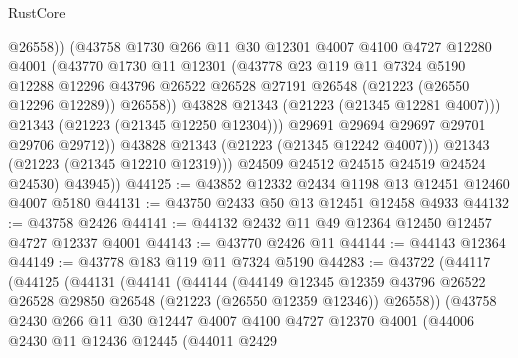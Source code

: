 \begin{lexlean}{RustCore}
\begin{coremodule}
                        @26558))
                    (@43758
                      @1730
                      @266
                      @11
                      @30
                      @12301
                      @4007
                      @4100
                      @4727
                      @12280
                      @4001
                      (@43770
                        @1730
                        @11
                        @12301
                        (@43778
                          @23
                          @119
                          @11
                          @7324
                          @5190
                          @12288
                          @12296
                          @43796
                          @26522
                          @26528
                          @27191
                          @26548
                          (@21223 (@26550 @12296 @12289))
                          @26558))
                      @43828
                      @21343
                      (@21223 (@21345 @12281 @4007)))
                    @21343
                    (@21223 (@21345 @12250 @12304)))
                  @29691
                  @29694
                  @29697
                  @29701
                  @29706
                  @29712))
              @43828
              @21343
              (@21223 (@21345 @12242 @4007)))
            @21343
            (@21223 (@21345 @12210 @12319)))
          @24509
          @24512
          @24515
          @24519
          @24524
          @24530)
        @43945))
@44125 := @43852 @12332 @2434 @1198 @13 @12451 @12460 @4007 @5180
@44131 := @43750 @2433 @50 @13 @12451 @12458 @4933
@44132 := @43758 @2426
@44141 := @44132 @2432 @11 @49 @12364 @12450 @12457 @4727 @12337 @4001
@44143 := @43770 @2426 @11
@44144 := @44143 @12364
@44149 := @43778 @183 @119 @11 @7324 @5190
@44283 := @43722
    (@44117
      (@44125
        (@44131
          (@44141
            (@44144
              (@44149
                @12345
                @12359
                @43796
                @26522
                @26528
                @29850
                @26548
                (@21223 (@26550 @12359 @12346))
                @26558))
            (@43758
              @2430
              @266
              @11
              @30
              @12447
              @4007
              @4100
              @4727
              @12370
              @4001
              (@44006
                @2430
                @11
                @12436
                @12445
                (@44011
                  @2429

\end{coremodule}
\end{lexlean}
